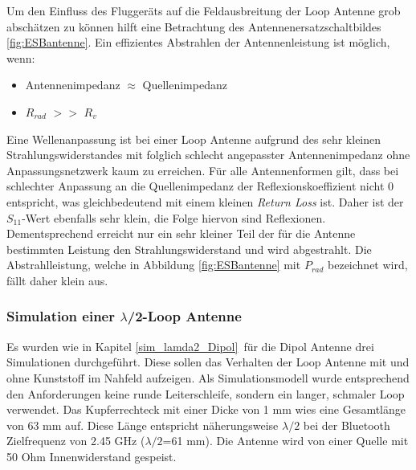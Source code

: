 Um den Einfluss des Fluggeräts auf die Feldausbreitung der Loop Antenne grob abschätzen zu können hilft eine Betrachtung des Antennenersatzschaltbildes \ref{fig:ESBantenne}. Ein effizientes Abstrahlen der Antennenleistung ist möglich, wenn:
 \begin{itemize}
 \item Antennenimpedanz $\approx$ Quellenimpedanz
 \item $R_{rad}$ $>>$ $R_{v}$ 
 \end{itemize}
Eine Wellenanpassung ist bei einer Loop Antenne aufgrund des sehr kleinen Strahlungswiderstandes mit folglich schlecht angepasster Antennenimpedanz ohne Anpassungsnetzwerk kaum zu erreichen. Für alle Antennenformen gilt, dass bei schlechter Anpassung an die Quellenimpedanz der Reflexionskoeffizient nicht 0 entspricht, was gleichbedeutend  mit einem kleinen \textit{Return Loss} ist. Daher ist der $S_{11}$-Wert ebenfalls sehr klein, die Folge hiervon sind Reflexionen. 
Dementsprechend erreicht nur ein sehr kleiner Teil der für die Antenne bestimmten Leistung den Strahlungswiderstand und wird abgestrahlt. Die Abstrahlleistung, welche in Abbildung \ref{fig:ESBantenne} mit $P_{rad}$ bezeichnet wird, fällt daher klein aus.

\subsubsection{Simulation einer $\lambda$/2-Loop Antenne}\label{sec:SimL2Loop}
Es wurden wie in Kapitel \ref{sim_lamda2_Dipol}\ für die Dipol Antenne drei Simulationen durchgeführt. Diese sollen das Verhalten der Loop Antenne mit und ohne Kunststoff im Nahfeld aufzeigen. Als Simulationsmodell wurde entsprechend den Anforderungen keine runde Leiterschleife, sondern ein langer, schmaler Loop verwendet. Das Kupferrechteck mit einer Dicke von 1 mm wies eine Gesamtlänge von 63 mm auf. Diese Länge entspricht näherungsweise $\lambda/2$ bei der Bluetooth Zielfrequenz von 2.45 GHz ($\lambda/2$=61 mm). Die Antenne wird von einer Quelle mit 50 Ohm Innenwiderstand gespeist. \\

